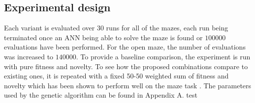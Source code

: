 \subsection{Experimental design}
\label{subsection:design}
Each variant is evaluated over $30$ runs for all of the mazes, each run being terminated once an ANN
being able to solve the maze is found or $100 000$ evaluations have been performed. For the open maze, the number of
evaluations was increased to $140 000$.
To provide a baseline comparison, the experiment is run with pure fitness and novelty. To see how
the proposed combinations compare to existing ones, it is repeated with a fixed 50-50 weighted sum
of fitness and novelty which has been shown to perform well on the maze task \cite{ns_study}.
The parameters used by the genetic algorithm can be found in Appendix A.
test
